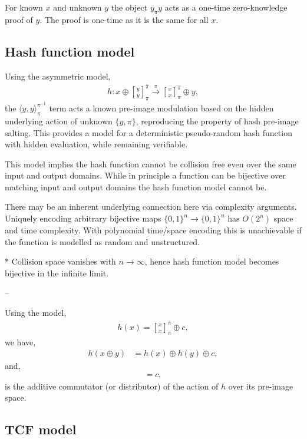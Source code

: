 \documentclass[twocolumn, aps, amsmath, amssymb, nofootinbib, superscriptaddress, longbibliography, doublefloatfix, table-of-contents, eqsecnum, rmp]{revtex4-2}
\def\braid#1#2#3#4{\langle#1,#2\rangle_{#3}^{#4}}
\newcommand{\stackbraid}[2]{{\genfrac{[}{]}{0pt}{}{{#1}}{{#2}}}^{\bar{\pi}}_{\pi}}
\begin{document}
For known $x$ and unknown $y$ the object $y_\pi y$ acts as a one-time zero-knowledge proof of $y$. The proof is one-time as it is the same for all $x$.

\subsection{Hash function model}

Using the asymmetric model,
\begin{align}
	h: x\oplus \stackbraid{y}{y} \xrightarrow{\pi} \stackbraid{x}{x} \oplus y,
\end{align}
the $\braid{y}{y}{\pi}{\pi^{-1}}$ term acts a known pre-image modulation based on the hidden underlying action of unknown $\{y,\pi\}$, reproducing the property of hash pre-image salting. This provides a model for a deterministic pseudo-random hash function with hidden evaluation, while remaining verifiable.

This model implies the hash function cannot be collision free even over the same input and output domains. While in principle a function can be bijective over matching input and output domains the hash function model cannot be.

There may be an inherent underlying connection here via complexity arguments. Uniquely encoding arbitrary bijective maps \mbox{$\{0,1\}^n\to \{0,1\}^n$} has $O(2^n)$ space and time complexity. With polynomial time/space encoding this is unachievable if the function is modelled as random and unstructured.

* Collision space vanishes with $n\to\infty$, hence hash function model becomes bijective in the infinite limit. 

--

Using the model,
\begin{align}
	h(x) = \stackbraid{x}{x} \oplus c,	
\end{align}
we have,
\begin{align}
	h(x\oplus y) &= h(x)\oplus h(y) \oplus c,
\end{align}
and,
\begin{align}
	[h(x\oplus y), h(x)\oplus h(y)] = c,
\end{align}
is the additive commutator (or distributor) of the action of $h$ over its pre-image space.

\subsection{TCF model}
\end{document}
